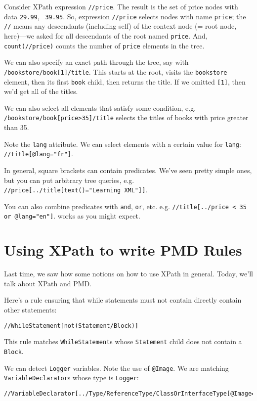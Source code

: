 \documentclass[11pt]{article}
\begin{document}
Consider XPath expression {\tt //price}. The
result is the set of price nodes with data {\tt 29.99}, {\tt
  39.95}. So, expression {\tt //price} selects nodes with name {\tt price};
the {\tt //} means any descendants (including self) of the context node (= root node, here)---we asked for all descendants of the root named {\tt price}.
And, {\tt count(//price)} counts the number of {\tt price} elements
in the tree.

We can also specify an exact path through the tree, say
with {\tt /bookstore/book[1]/title}. This starts at the root,
visits the {\tt bookstore} element, then its first {\tt book} child,
then returns the title. If we omitted {\tt [1]}, then we'd
get all of the titles.

We can also select all elements that satisfy some condition,
e.g. {\tt /bookstore/book[price>35]/title} selects the titles
of books with price greater than 35.

Note the {\tt lang} attribute. We can select elements with a
certain value for {\tt lang}: {\tt //title[@lang="fr"]}.

In general, square brackets can contain predicates. We've 
seen pretty simple ones, but you can put arbitrary tree queries,
e.g. {\tt //price[../title[text()="Learning XML"]]}.

You can also combine predicates with {\tt and}, {\tt or}, etc.
e.g. {\tt //title[../price < 35 or @lang="en"]}. 
{\tt *} works as you might expect.

\section*{Using XPath to write PMD Rules}
Last time, we saw how some notions on how to use XPath in general.
Today, we'll talk about XPath and PMD. 

Here's a rule ensuring that while statements must not contain directly contain
other statements:

{\tt //WhileStatement[not(Statement/Block)]}

This rule matches {\tt WhileStatement}s whose {\tt Statement} child
does not contain a {\tt Block}.

We can detect {\tt Logger} variables. Note the use of {\tt @Image}. We are matching {\tt VariableDeclarator}s whose type is {\tt Logger}:
{\small \begin{verbatim}
//VariableDeclarator[../Type/ReferenceType/ClassOrInterfaceType[@Image='Logger']]
\end{verbatim}
}
\end{document}
